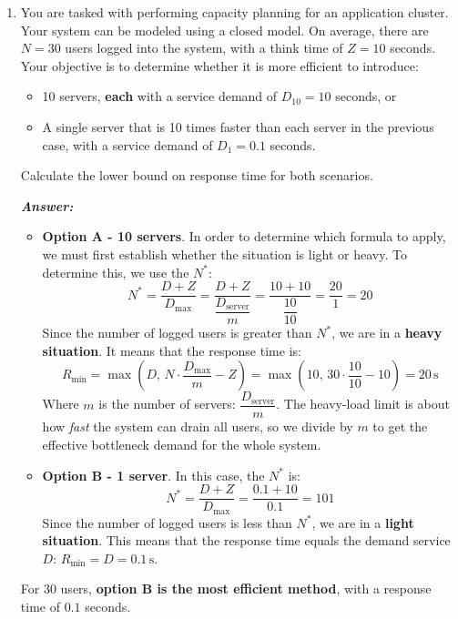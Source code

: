 \begin{enumerate}
    \item You are tasked with performing capacity planning for an application cluster. Your system can be modeled using a closed model. On average, there are $N = 30$ users logged into the system, with a think time of $Z = 10$ seconds. Your objective is to determine whether it is more efficient to introduce:
    \begin{itemize}
        \item 10 servers, \textbf{each} with a service demand of $D_{10} = 10$ seconds, or
        \item A single server that is 10 times faster than each server in the previous case, with a service demand of $D_{1} = 0.1$ seconds.
    \end{itemize}
    Calculate the lower bound on response time for both scenarios.

    \textcolor{Green3}{\textbf{\emph{Answer:}}}
    \begin{itemize}
        \item \textbf{Option A - 10 servers}. In order to determine which formula to apply, we must first establish whether the situation is light or heavy. To determine this, we use the $N^{*}$:
        \begin{equation*}
            N^{*} = \dfrac{D + Z}{D_{\max}} = \dfrac{D + Z}{\dfrac{D_{\text{server}}}{m}} = \dfrac{10 + 10}{\dfrac{10}{10}} = \dfrac{20}{1} = 20
        \end{equation*}
        Since the number of logged users is greater than $N^{*}$, we are in a \textbf{heavy situation}. It means that the response time is:
        \begin{equation*}
            R_{\min} = \max\left(D, \, N \cdot \dfrac{D_{\max}}{m} - Z\right) = \max\left(10, \, 30 \cdot \dfrac{10}{10} - 10\right) = 20 \, \text{s}
        \end{equation*}
        Where $m$ is the number of servers: $\dfrac{D_{\text{server}}}{m}$. The heavy-load limit is about how \emph{fast} the system can drain all users, so we divide by $m$ to get the effective bottleneck demand for the whole system.

        \newpage

        \item \textbf{Option B - 1 server}. In this case, the $N^{*}$ is:
        \begin{equation*}
            N^{*} = \dfrac{D + Z}{D_{\max}} = \dfrac{0.1 + 10}{0.1} = 101
        \end{equation*}
        Since the number of logged users is less than $N^{*}$, we are in a \textbf{light situation}. This means that the response time equals the demand service $D$: $R_{\min} = D = 0.1 \, \text{s}$.
    \end{itemize}
    For 30 users, \textbf{option B is the most efficient method}, with a response time of $0.1$ seconds.



\end{enumerate}
